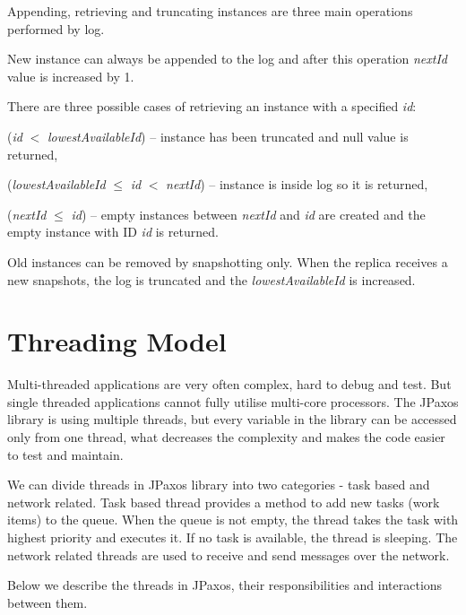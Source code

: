 Appending, retrieving and truncating instances are three main operations per\-for\-med by log.

New instance can always be appended to the log and after this operation \textit{nextId} value is increased by 1. 

\noindent There are three possible cases of retrieving an instance with a specified \textit{id}:
\begin{tightList}
  \item[\textbullet] (\textit{id} $<$ \textit{lowestAvailableId}) -- instance has been truncated and null value is returned,
  \item[\textbullet] (\textit{lowestAvailableId} $\leq$ \textit{id} $<$ \textit{nextId}) -- instance is inside log so it is returned,
  \item[\textbullet] (\textit{nextId} $\leq$ \textit{id}) -- empty instances between \textit{nextId} and \textit{id} are created and the empty instance with ID \textit{id} is returned.
\end{tightList}

\noindent Old instances can be removed by snapshotting only. When the replica receives a new snapshots, the log is truncated and the \textit{lowestAvailableId} is increased.

\section{Threading Model}
\label{sec:threads}

Multi-threaded applications are very often complex, hard to debug and test. But single threaded applications cannot fully utilise multi-core processors. The JPaxos library is using multiple threads, but every variable in the library can be accessed only from one thread, what decreases the complexity and makes the code easier to test and maintain.

We can divide threads in JPaxos library into two categories - task based and
network related.
Task based thread provides a method to add new tasks (work
items) to the queue. When the queue is not empty, the thread takes the task
with highest priority and executes it. If no task is available, the thread is
sleeping. The network related threads are used to receive and send messages
over the network.

Below we describe the threads in JPaxos, their responsibilities and interactions between them. 

